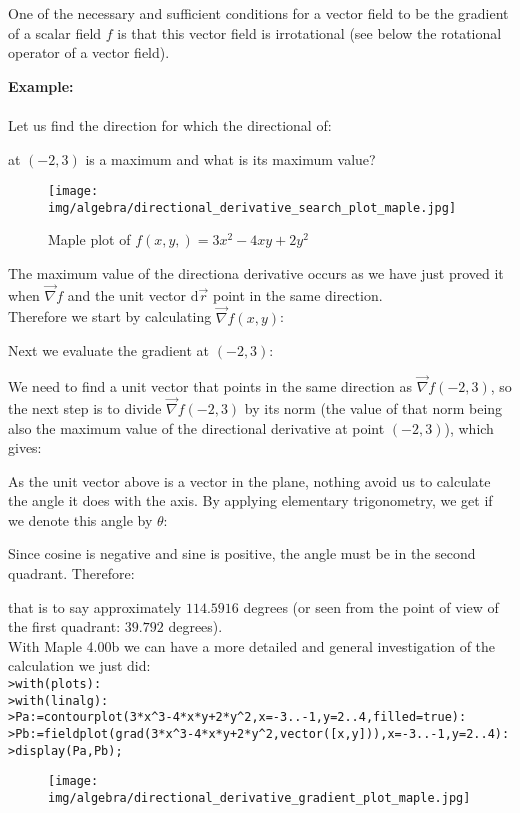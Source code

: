 	\begin{tcolorbox}[title=Remark,colframe=black,arc=10pt]
	One of the necessary and sufficient conditions for a vector field to be the gradient of a scalar field $f$ is that this vector field is irrotational (see below the rotational operator of a vector field).
	\end{tcolorbox}
	\begin{tcolorbox}[colframe=black,colback=white,sharp corners]
	\textbf{{\Large {}}Example:}\\\\
	Let us find the direction for which the directional of:
	
	at $(-2,3)$ is a maximum and what is its maximum value?
	\begin{figure}[H]
		\centering
		\texttt{[image: img/algebra/directional\_derivative\_search\_plot\_maple.jpg]}
		\caption[]{Maple plot of $f(x,y,)=3x^2-4xy+2y^2$}
	\end{figure}
	The maximum value of the directiona derivative occurs as we have just proved it when $\vec{\nabla}f$ and the unit vector $\mathrm{d}\vec{r}$ point in the same direction.\\

	Therefore we start by calculating $\vec{\nabla}f(x,y)$:
	
	Next we evaluate the gradient at $(-2,3)$:
	
	\end{tcolorbox}
	\begin{tcolorbox}[colframe=black,colback=white,sharp corners]
	We need to find a unit vector that points in the same direction as $\vec{\nabla}f(-2,3)$, so the next step is to divide $\vec{\nabla}f(-2,3)$ by its norm (the value of that norm being also the maximum value of the directional derivative at point $(-2,3)$), which gives:
	
	As the unit vector above is a vector in the plane, nothing avoid us to calculate the angle it does with the axis. By applying elementary trigonometry, we get if we denote this angle by $\theta$:
	
	Since cosine is negative and sine is positive, the angle must be in the second quadrant. Therefore:
	
	that is to say approximately $114.5916$ degrees (or seen from the point of view of the first quadrant: $39.792$ degrees).\\
	
	With Maple 4.00b we can have a more detailed and general investigation of the calculation we just did:\\

	\texttt{>with(plots):\\
	>with(linalg):\\
	>Pa:=contourplot(3*x\string^3-4*x*y+2*y\string^2,x=-3..-1,y=2..4,filled=true):\\
	>Pb:=fieldplot(grad(3*x\string^3-4*x*y+2*y\string^2,vector([x,y])),x=-3..-1,y=2..4):\\
	>display(Pa,Pb);
	}
	\begin{figure}[H]
		\centering
		\texttt{[image: img/algebra/directional\_derivative\_gradient\_plot\_maple.jpg]}
	\end{figure}
	\end{tcolorbox}
